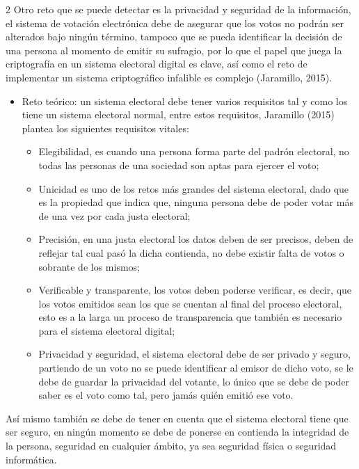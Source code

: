 \documentclass[12pt,spanish,Letterpaper,openany]{book}
\begin{document}
\begin {multicols}{2}
Otro reto que se puede detectar es la privacidad y seguridad de la información, el sistema de votación electrónica debe de asegurar que los votos no podrán ser alterados bajo ningún término, tampoco que se pueda identificar la decisión de una persona al momento de emitir su sufragio, por lo que el papel que juega la criptografía en un sistema electoral digital es clave, así como el reto de implementar un sistema criptográfico infalible es complejo (Jaramillo, 2015).

\begin{itemize}
\item
  Reto teórico: un sistema electoral debe tener varios requisitos tal y como los tiene un sistema electoral normal, entre estos requisitos, Jaramillo (2015) plantea los siguientes requisitos vitales:

  \begin{itemize}
  \item
    Elegibilidad, es cuando una persona forma parte del padrón electoral, no todas las personas de una sociedad son aptas para ejercer el voto;
  \item
    Unicidad es uno de los retos más grandes del sistema electoral, dado que es la propiedad que indica que, ninguna persona debe de poder votar más de una vez por cada justa electoral;
  \item
    Precisión, en una justa electoral los datos deben de ser precisos, deben de reflejar tal cual pasó la dicha contienda, no debe existir falta de votos o sobrante de los mismos;
  \item
    Verificable y transparente, los votos deben poderse verificar, es decir, que los votos emitidos sean los que se cuentan al final del proceso electoral, esto es a la larga un proceso de transparencia que también es necesario para el sistema electoral digital;
  \item
    Privacidad y seguridad, el sistema electoral debe de ser privado y seguro, partiendo de un voto no se puede identificar al emisor de dicho voto, se le debe de guardar la privacidad del votante, lo único que se debe de poder saber es el voto como tal, pero jamás quién emitió ese voto.
  \end{itemize}
\end{itemize}

Así mismo también se debe de tener en cuenta que el sistema electoral tiene que ser seguro, en ningún momento se debe de ponerse en contienda la integridad de la persona, seguridad en cualquier ámbito, ya sea seguridad física o seguridad informática.


\end{multicols}
\end{document}
